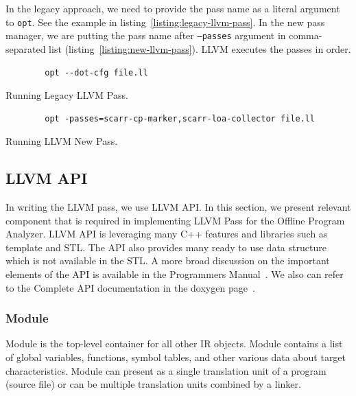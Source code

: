 In the legacy approach, we need to provide the pass name as a literal argument
to \texttt{opt}. See the example in listing~\ref{listing:legacy-llvm-pass}. In
the new pass manager, we are putting the pass name after \texttt{--passes}
argument in comma-separated list (listing~\ref{listing:new-llvm-pass}). LLVM
executes the passes in order.

\begin{listing}[htbp]
    \begin{verbatim}
        opt --dot-cfg file.ll 
    \end{verbatim}
    \caption{Running Legacy LLVM Pass.}    
    \label{listing:legacy-llvm-pass}
\end{listing}

\begin{listing}[htpb]
    \begin{verbatim}
        opt -passes=scarr-cp-marker,scarr-loa-collector file.ll 
    \end{verbatim}
    \caption{Running LLVM New Pass.}    
    \label{listing:new-llvm-pass}
\end{listing}

\subsection{LLVM API}

In writing the LLVM pass, we use LLVM API. In this section, we present relevant
component that is required in implementing LLVM Pass for the Offline Program
Analyzer. LLVM API is leveraging many C++ features and libraries such as
template and STL. The API also provides many ready to use data structure which
is not available in the STL. A more broad discussion on the important elements
of the API is available in the Programmers Manual~\cite{LLVMProgrammerManuala}.
We also can refer to the Complete API documentation in the doxygen
page~\cite{LLVMLLVMa}.

\subsubsection{Module}

Module is the top-level container for all other IR objects. Module contains a
list of global variables, functions, symbol tables, and other various data about
target characteristics. Module can present as a single translation unit of a
program (source file) or can be multiple translation units combined by a linker.


